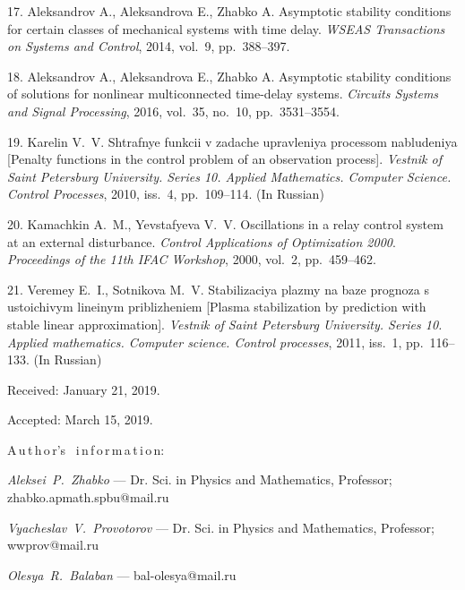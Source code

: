 {17. Aleksandrov A., Aleksandrova E., Zhabko A. Asymptotic
stability conditions for certain classes of mechanical systems
with time delay. \emph{WSEAS Transactions on Systems and Control},
2014, vol.~9, pp.~388--397.

18. Aleksandrov A., Aleksandrova E., Zhabko A. Asymptotic
stability conditions of solutions for nonlinear multiconnected
time-delay systems. \emph{Circuits  Systems and Signal
Processing}, 2016, vol.~35, no.~10, pp.~3531--3554.

19. Karelin V.~V.  Shtrafnye funkcii v zadache upravleniya
processom nabludeniya [Penalty functions in the control problem of
an observation process]. \emph{Vestnik of Saint Petersburg
University. Series 10. Applied Mathematics. Computer Science.
Control Processes}, 2010, iss.~4, pp.~109--114. (In Russian)

20. Kamachkin A.~M., Yevstafyeva V.~V.   Oscillations in a relay
control system at an external disturbance.  \emph{Control
Applications of Optimization 2000}. \emph{Proceedings of the 11th
IFAC Workshop}, 2000, vol.~2, pp.~459--462.

21. Veremey E.~I., Sotnikova M.~V. Stabilizaciya plazmy na baze
prognoza s ustoichivym lineinym priblizheniem [Plasma
stabilization by prediction with stable linear approximation].
\emph{Vestnik of Saint Petersburg University. Series 10. Applied
mathematics. Computer science. Control processes}, 2011, iss.~1,
pp.~116--133. (In Russian)


\vskip 1.5mm

%


Received:  January 21, 2019.

Accepted: March 15, 2019.

\vskip6mm A\,u\,t\,h\,o\,r's \ i\,n\,f\,o\,r\,m\,a\,t\,i\,o\,n:

\vskip2mm\textit{Aleksei~P.~Zhabko} --- Dr. Sci. in Physics and
Mathematics, Professor; zhabko.apmath.spbu@mail.ru

\vskip2mm\textit{Vyacheslav~V.~Provotorov} --- Dr. Sci. in Physics
and Mathematics, Professor; wwprov@mail.ru

\vskip2mm\textit{Olesya~R.~Balaban} --- bal-olesya@mail.ru

}
